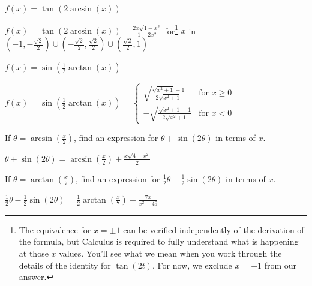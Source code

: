 \documentclass{ximera}
\begin{document}
\begin{question}
\begin{problem}
$f(x) = \tan \left( 2 \arcsin(x) \right)$ 

\begin{solution}
$f(x) =\tan \left( 2 \arcsin(x) \right) = \frac{2x\sqrt{1 - x^{2}}}{1 - 2x^{2}}$ for\footnote{The equivalence for $x = \pm 1$ can be verified independently of the derivation of the formula, but Calculus is required to fully understand what is happening at those $x$ values.  You'll see what we mean when you work through the details of the identity for $\tan(2t).$  For now, we exclude $x = \pm 1$ from our answer.}  $x$ in $\left(-1, -\frac{\sqrt{2}}{2}\right) \cup \left(-\frac{\sqrt{2}}{2}, \frac{\sqrt{2}}{2} \right) \cup \left(\frac{\sqrt{2}}{2}, 1\right)$
\end{solution}
\end{problem}

\begin{problem} \label{rewritelast}
$f(x) = \sin \left( \frac{1}{2}\arctan(x) \right)$ 

\begin{solution}
$f(x) =\sin \left( \frac{1}{2}\arctan(x) \right) = \left\{ \begin{array}{rr} \sqrt{\frac{\sqrt{x^{2} + 1} - 1}{2\sqrt{x^{2} + 1}}} & \text{for $x \geq 0$} \\ [10pt] -\sqrt{\frac{\sqrt{x^{2} + 1} - 1}{2\sqrt{x^{2} + 1}}} & \text{for $x < 0$}  \end{array}\right. $
\end{solution}
\end{problem}

\end{question}

\begin{problem}
If $\theta = \arcsin\left(\frac{x}{2}\right)$,  find an expression for $\theta + \sin(2\theta)$ in terms of $x$.

\begin{solution}
$\theta + \sin(2\theta) = \arcsin \left( \frac{x}{2} \right) + \frac{x\sqrt{4 - x^{2}}}{2}$
\end{solution}
\end{problem}

\begin{problem}
If $\theta = \arctan\left(\frac{x}{7}\right)$, find an expression for $\frac{1}{2}\theta - \frac{1}{2}\sin(2\theta)$ in terms of $x$.

\begin{solution}
$\frac{1}{2}\theta - \frac{1}{2}\sin(2\theta) = \frac{1}{2} \arctan \left( \frac{x}{7} \right) - \frac{7x}{x^{2} + 49}$
\end{solution}
\end{problem}
\end{document}
